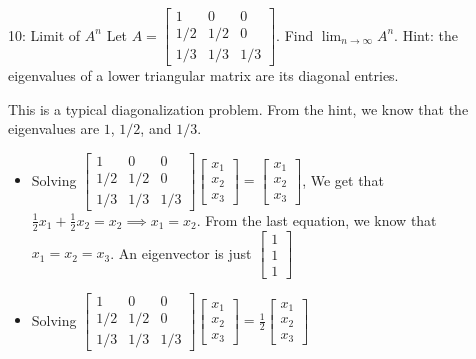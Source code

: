 \documentclass[../main]{subfiles}
\begin{document}
\begin{bbox}{10: Limit of $A^n$}
    Let $A = \begin{bmatrix}
        1 & 0 & 0\\
        1/2 & 1/2 & 0\\
        1/3 & 1/3 & 1/3
    \end{bmatrix}$. Find $\lim_{n\to \infty} A^n$. Hint: the eigenvalues of a lower triangular matrix are its diagonal entries.
\end{bbox}
\begin{solution}
    This is a typical diagonalization problem. From the hint, we know that the eigenvalues are $1$, $1/2$, and $1/3$. 
    \begin{itemize}
        \item Solving $\begin{bmatrix}
            1 & 0 & 0\\
        1/2 & 1/2 & 0\\
        1/3 & 1/3 & 1/3
        \end{bmatrix} \begin{bmatrix}
             x_1  \\ x_2 \\ x_3
        \end{bmatrix} = \begin{bmatrix}
             x_1  \\ x_2 \\ x_3
        \end{bmatrix}$, We get that $\frac{1}{2}x_1 + \frac{1}{2}x_2 =x_2\implies x_1 = x_2$. From the last equation, we know that $x_1=x_2=x_3$. An eigenvector is just $\begin{bmatrix}
            1\\1\\1
        \end{bmatrix}$
        \item Solving $\begin{bmatrix}
            1 & 0 & 0\\
        1/2 & 1/2 & 0\\
        1/3 & 1/3 & 1/3
        \end{bmatrix} \begin{bmatrix}
             x_1  \\ x_2 \\ x_3
        \end{bmatrix} = \frac{1}{2}\begin{bmatrix}
             x_1  \\ x_2 \\ x_3
        \end{bmatrix}$
    \end{itemize}
\end{solution}
\end{document}
